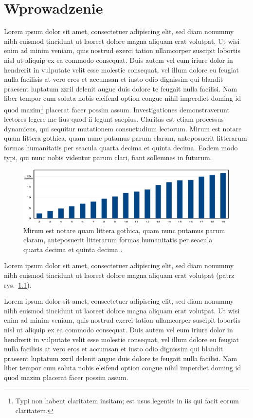 \chapter{Wprowadzenie}

Lorem ipsum dolor sit amet, consectetuer adipiscing elit, sed diam nonummy nibh euismod tincidunt ut laoreet dolore magna aliquam erat volutpat. Ut wisi enim ad minim veniam, quis nostrud exerci tation ullamcorper suscipit lobortis nisl ut aliquip ex ea commodo consequat. Duis autem vel eum iriure dolor in hendrerit in vulputate velit esse molestie consequat, vel illum dolore eu feugiat nulla facilisis at vero eros et accumsan et iusto odio dignissim qui blandit praesent luptatum zzril delenit augue duis dolore te feugait nulla facilisi. Nam liber tempor cum soluta nobis eleifend option congue nihil imperdiet doming id quod mazim\footnote{Typi non habent claritatem insitam; est usus legentis in iis qui facit eorum claritatem.} placerat facer possim assum. Investigationes demonstraverunt lectores legere me lius quod ii legunt saepius. Claritas est etiam processus dynamicus, qui sequitur mutationem consuetudium lectorum. Mirum est notare quam littera gothica, quam nunc putamus parum claram, anteposuerit litterarum formas humanitatis per seacula quarta decima et quinta decima. Eodem modo typi, qui nunc nobis videntur parum clari, fiant sollemnes\cite{OPTO-Skoczylas} in futurum.

\begin{figure}[htpb]
\centering
\includegraphics[width=14cm]{./../img/recogspeedup_300.eps}
\caption{Mirum est notare quam littera gothica, quam nunc putamus parum claram, anteposuerit litterarum formas humanitatis per seacula quarta decima et quinta decima \cite{OPTO-Skoczylas}.}
\label{my-scheme}
\end{figure}

Lorem ipsum dolor sit amet, consectetuer adipiscing elit, sed diam nonummy nibh euismod tincidunt ut laoreet dolore magna aliquam erat volutpat (patrz rys.~\ref{my-scheme}). 

\par
Lorem ipsum dolor sit amet, consectetuer adipiscing elit, sed diam nonummy nibh euismod tincidunt ut laoreet dolore magna aliquam erat volutpat. Ut wisi enim ad minim veniam, quis nostrud exerci tation ullamcorper suscipit lobortis nisl ut aliquip ex ea commodo consequat. Duis autem vel eum iriure dolor in hendrerit in vulputate velit esse molestie consequat, vel illum dolore eu feugiat nulla facilisis at vero eros et accumsan et iusto odio dignissim qui blandit praesent luptatum zzril delenit augue duis dolore te feugait nulla facilisi. Nam liber tempor cum soluta nobis eleifend option congue nihil imperdiet doming id quod mazim placerat facer possim assum. 

